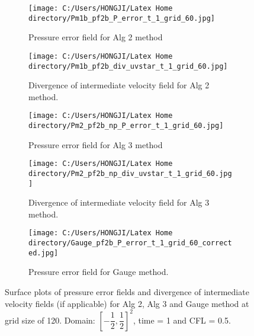 \begin{figure}[H]
	\centering
	\begin{subfigure}[t]{2.2in}
		\centering
		\texttt{[image: C:/Users/HONGJI/Latex Home directory/Pm1b\_pf2b\_P\_error\_t\_1\_grid\_60.jpg]}
		\caption{Pressure error field for Alg 2 method}\label{fig:6.11a}		
	\end{subfigure}
	\quad
	\begin{subfigure}[t]{2.6in}
		\centering
		\texttt{[image: C:/Users/HONGJI/Latex Home directory/Pm1b\_pf2b\_div\_uvstar\_t\_1\_grid\_60.jpg]}
		\caption{Divergence of intermediate velocity field for Alg 2 method. }\label{fig:6.11b}
	\end{subfigure}
	\quad
	\centering
	\begin{subfigure}[t]{2.2in}
		\centering
		\texttt{[image: C:/Users/HONGJI/Latex Home directory/Pm2\_pf2b\_np\_P\_error\_t\_1\_grid\_60.jpg]}
		\caption{Pressure error field for Alg 3 method}\label{fig:6.11c}		
	\end{subfigure}
	\quad
	\begin{subfigure}[t]{2.6in}
		\centering
		\texttt{[image: C:/Users/HONGJI/Latex Home directory/Pm2\_pf2b\_np\_div\_uvstar\_t\_1\_grid\_60.jpg]}
		\caption{Divergence of intermediate velocity field for Alg 3 method.}\label{fig:6.11d}
	\end{subfigure}
	\quad
	\begin{subfigure}[t]{3.2in}
		\centering
		\texttt{[image: C:/Users/HONGJI/Latex Home directory/Gauge\_pf2b\_P\_error\_t\_1\_grid\_60\_corrected.jpg]}
		\caption{Pressure error field for Gauge method. }\label{fig:6.11e}
	\end{subfigure}
	\caption{Surface plots of pressure error fields and divergence of intermediate velocity fields (if applicable) for Alg 2, Alg 3 and Gauge method at grid size of 120. Domain: $[-\dfrac{1}{2},\dfrac{1}{2}]^2$, time = 1 and CFL = 0.5. }\label{fig:6.11}
\end{figure}


